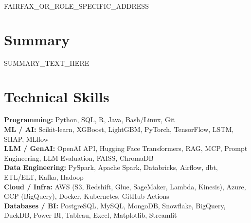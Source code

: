 \documentclass[letterpaper,9pt]{article}
\begin{document}

	\begin{center}
		FAIRFAX_OR_ROLE_SPECIFIC_ADDRESS
	\end{center}


	\section*{Summary}
	SUMMARY_TEXT_HERE


	\section*{Technical Skills}
	\textbf{Programming:} Python, SQL, R, Java, Bash/Linux, Git \\
	\textbf{ML / AI:} Scikit-learn, XGBoost, LightGBM, PyTorch, TensorFlow, LSTM, SHAP, MLflow \\
	\textbf{LLM / GenAI:} OpenAI API, Hugging Face Transformers, RAG, MCP, Prompt Engineering, LLM Evaluation, FAISS, ChromaDB \\
	\textbf{Data Engineering:} PySpark, Apache Spark, Databricks, Airflow, dbt, ETL/ELT, Kafka, Hadoop \\
	\textbf{Cloud / Infra:} AWS (S3, Redshift, Glue, SageMaker, Lambda, Kinesis), Azure, GCP (BigQuery), Docker, Kubernetes, GitHub Actions \\
	\textbf{Databases / BI:} PostgreSQL, MySQL, MongoDB, Snowflake, BigQuery, DuckDB, Power BI, Tableau, Excel, Matplotlib, Streamlit

\end{document}
